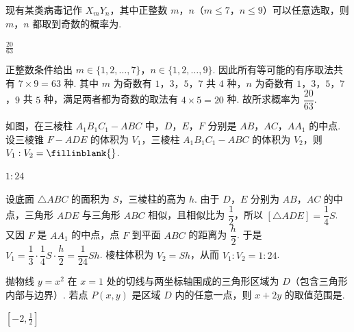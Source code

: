 \begin{problem}
现有某类病毒记作 \(X_mY_n\)，其中正整数 \(m\)，\(n\)（\(m\leqslant 7\)，\(n\leqslant 9\)）可以任意选取，则 \(m\)，\(n\) 都取到奇数的概率为\fillinblank{}.
\end{problem}

\begin{answer}
\(\frac{20}{63}\)
\end{answer}

\begin{solution}
正整数条件给出 \(m\in\{1,2,\ldots,7\}\)，\(n\in\{1,2,\ldots,9\}\). 因此所有等可能的有序取法共有 \(7\times9=63\) 种. 其中 \(m\) 为奇数有 \(1\)，\(3\)，\(5\)，\(7\) 共 \(4\) 种，\(n\) 为奇数有 \(1\)，\(3\)，\(5\)，\(7\)，\(9\) 共 \(5\) 种，满足两者都为奇数的取法有 \(4\times5=20\) 种. 故所求概率为 \(\dfrac{20}{63}\).
\end{solution}

\begin{problem}
如图，在三棱柱 \(A_1B_1C_1-ABC\) 中，\(D\)，\(E\)，\(F\) 分别是 \(AB\)，\(AC\)，\(AA_1\) 的中点. 设三棱锥 \(F-ADE\) 的体积为 \(V_1\)，三棱柱 \(A_1B_1C_1-ABC\) 的体积为 \(V_2\)，则 \(V_1:V_2=\fillinblank{}\).

\end{problem}

\begin{answer}
\(1:24\)
\end{answer}

\begin{solution}
设底面 \(\triangle ABC\) 的面积为 \(S\)，三棱柱的高为 \(h\). 由于 \(D\)，\(E\) 分别为 \(AB\)，\(AC\) 的中点，三角形 \(ADE\) 与三角形 \(ABC\) 相似，且相似比为 \(\dfrac12\)，所以
\([\triangle ADE]=\dfrac14S\). 又因 \(F\) 是 \(AA_1\) 的中点，点 \(F\) 到平面 \(ABC\) 的距离为 \(\dfrac h2\). 于是
\(V_1=\dfrac13\cdot\dfrac14S\cdot\dfrac h2=\dfrac1{24}Sh\). 棱柱体积为 \(V_2=Sh\)，从而 \(V_1:V_2=1:24\).
\end{solution}

\begin{problem}
抛物线 \(y=x^2\) 在 \(x=1\) 处的切线与两坐标轴围成的三角形区域为 \(D\)（包含三角形内部与边界）. 若点 \(P(x,y)\) 是区域 \(D\) 内的任意一点，则 \(x+2y\) 的取值范围是\fillinblank{}.
\end{problem}

\begin{answer}
\(\left[-2,\frac{1}{2}\right]\)
\end{answer}

